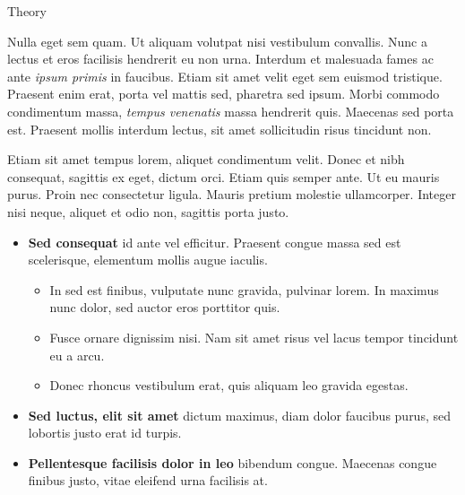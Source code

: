 \begin{block}{Theory}

Nulla eget sem quam. Ut aliquam volutpat nisi vestibulum convallis. Nunc a
lectus et eros facilisis hendrerit eu non urna. Interdum et malesuada fames
ac ante \textit{ipsum primis} in faucibus. Etiam sit amet velit eget sem
euismod tristique. Praesent enim erat, porta vel mattis sed, pharetra sed
ipsum. Morbi commodo condimentum massa, \textit{tempus venenatis} massa
hendrerit quis. Maecenas sed porta est. Praesent mollis interdum lectus,
sit amet sollicitudin risus tincidunt non.

Etiam sit amet tempus lorem, aliquet condimentum velit. Donec et nibh
consequat, sagittis ex eget, dictum orci. Etiam quis semper ante. Ut eu
mauris purus. Proin nec consectetur ligula. Mauris pretium molestie
ullamcorper. Integer nisi neque, aliquet et odio non, sagittis porta justo.

\begin{itemize}
  \item \textbf{Sed consequat} id ante vel efficitur. Praesent congue massa
    sed est scelerisque, elementum mollis augue iaculis.
    \begin{itemize}
      \item In sed est finibus, vulputate
        nunc gravida, pulvinar lorem. In maximus nunc dolor, sed auctor eros
        porttitor quis.
      \item Fusce ornare dignissim nisi. Nam sit amet risus vel lacus
        tempor tincidunt eu a arcu.
      \item Donec rhoncus vestibulum erat, quis aliquam leo
        gravida egestas.
    \end{itemize}
  \item \textbf{Sed luctus, elit sit amet} dictum maximus, diam dolor
    faucibus purus, sed lobortis justo erat id turpis.
  \item \textbf{Pellentesque facilisis dolor in leo} bibendum congue.
    Maecenas congue finibus justo, vitae eleifend urna facilisis at.
\end{itemize}

\end{block}
